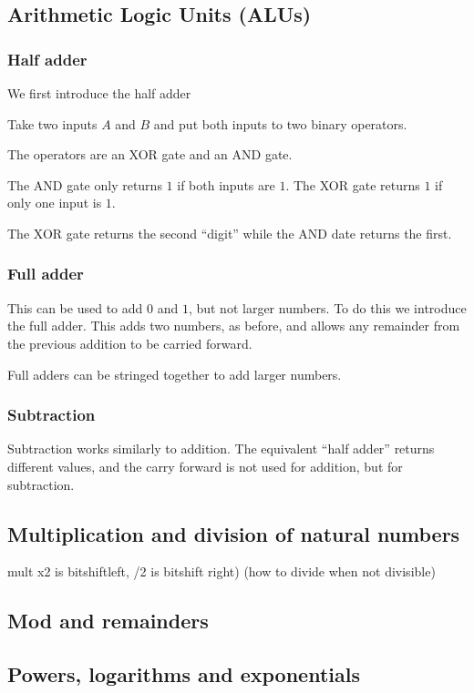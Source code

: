 
\subsection{Arithmetic Logic Units (ALUs)}

\subsubsection{Half adder}

We first introduce the half adder

Take two inputs \(A\) and \(B\) and put both inputs to two binary operators.

The operators are an XOR gate and an AND gate.

The AND gate only returns \(1\) if both inputs are \(1\). The XOR gate returns \(1\) if only one input is \(1\).

The XOR gate returns the second “digit” while the AND date returns the first.

\subsubsection{Full adder}

This can be used to add \(0\) and \(1\), but not larger numbers. To do this we introduce the full adder. This adds two numbers, as before, and allows any remainder from the previous addition to be carried forward.

Full adders can be stringed together to add larger numbers.	

\subsubsection{Subtraction}

Subtraction works similarly to addition. The equivalent “half adder” returns different values, and the carry forward is not used for addition, but for subtraction.


\subsection{Multiplication and division of natural numbers}

mult x2 is bitshiftleft, /2 is bitshift right) (how to divide when not divisible)

\subsection{Mod and remainders}

\subsection{Powers, logarithms and exponentials}


